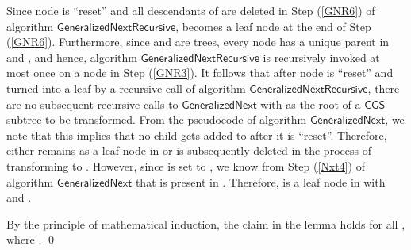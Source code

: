 \documentclass[3p]{elsarticle}
\newcommand{\CGS}{\ensuremath{\textsf{CGS }}}
\newcommand{\algo}[1]{\ensuremath{\textsf{{#1}}}}
\begin{document}
Since node  is ``reset'' and all descendants of  are deleted in
Step (\ref{GNR6}) of algorithm \algo{GeneralizedNextRecursive}, 
becomes a leaf node at the end of Step (\ref{GNR6}).  Furthermore,
since  and  are trees, every node has a unique parent
in  and , and hence, algorithm
\algo{GeneralizedNextRecursive} is recursively invoked at most once on
a node in Step (\ref{GNR3}).  It follows that after node  is
``reset'' and turned into a leaf by a recursive call of algorithm
\algo{GeneralizedNextRecursive}, there are no subsequent recursive
calls to \algo{GeneralizedNext} with  as the root of a \CGS subtree
to be transformed.  From the pseudocode of algorithm
\algo{GeneralizedNext}, we note that this implies that no child gets
added to  after it is ``reset''.  Therefore,  either remains as
a leaf node in  or is subsequently deleted in the process of
transforming  to .  However, since  is set to
, we know from Step (\ref{Nxt4}) of algorithm
\algo{GeneralizedNext} that  is present in .  Therefore,
 is a leaf node in  with  and
.

By the principle of mathematical induction, the claim in the lemma
holds for all , where .  \qed
\end{document}
